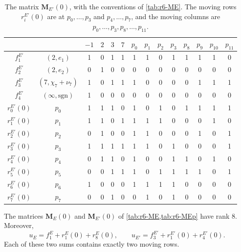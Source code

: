 \begin{table}[htbp]
\centering
\setlength{\tabcolsep}{4.2pt}
\caption{The matrix $\mathbf M_{E'}(0)$, with the conventions of \cref{tab:r6-ME}. The moving rows $r^{E'}_i(0)$ are at $p_0,\dots,p_3$ and $p_4,\dots,p_7$, and the moving columns are $p_0,\dots,p_3,p_8,\dots,p_{11}$.}
\label{tab:r6-MEp}
\begin{tabular}{cc@{\hspace{10pt}}cccc@{\hspace{12pt}}cccccccc}
\toprule
 & & $-1$ & $2$ & $3$ & $7$ & $p_0$ & $p_1$ & $p_2$ & $p_3$ & $p_8$ & $p_9$ & $p_{10}$ & $p_{11}$\\
\midrule
$f^{E'}_1$ & $(2,e_1)$ & 1 & 0 & 1 & 1 & 1 & 1 & 0 & 1 & 1 & 1 & 1 & 0 \\
$f^{E'}_2$ & $(2,e_2)$ & 0 & 1 & 0 & 0 & 0 & 0 & 0 & 0 & 0 & 0 & 0 & 0 \\
$f^{E'}_3$ & $(7,\chi_7+\nu_7)$ & 1 & 0 & 1 & 1 & 1 & 0 & 0 & 0 & 0 & 1 & 1 & 1 \\
$f^{E'}_4$ & $(\infty,\mathrm{sgn})$ & 1 & 0 & 0 & 0 & 0 & 0 & 0 & 0 & 0 & 0 & 0 & 0 \\
\midrule
$r^{E'}_0(0)$ & $p_0$ & 1 & 1 & 1 & 0 & 1 & 0 & 1 & 0 & 1 & 1 & 1 & 1 \\
$r^{E'}_1(0)$ & $p_1$ & 1 & 1 & 0 & 1 & 1 & 1 & 1 & 0 & 0 & 0 & 1 & 0 \\
$r^{E'}_2(0)$ & $p_2$ & 0 & 1 & 0 & 0 & 1 & 1 & 0 & 0 & 0 & 1 & 0 & 1 \\
$r^{E'}_3(0)$ & $p_3$ & 1 & 1 & 1 & 1 & 1 & 1 & 0 & 1 & 0 & 0 & 0 & 1 \\
$r^{E'}_4(0)$ & $p_4$ & 0 & 1 & 1 & 0 & 1 & 0 & 0 & 1 & 1 & 0 & 1 & 0 \\
$r^{E'}_5(0)$ & $p_5$ & 0 & 0 & 1 & 1 & 1 & 0 & 1 & 1 & 1 & 1 & 0 & 1 \\
$r^{E'}_6(0)$ & $p_6$ & 1 & 0 & 0 & 0 & 1 & 1 & 1 & 1 & 0 & 0 & 0 & 0 \\
$r^{E'}_7(0)$ & $p_7$ & 0 & 0 & 1 & 0 & 0 & 1 & 0 & 1 & 0 & 0 & 0 & 0 \\
\bottomrule
\end{tabular}
\end{table}

\begin{lemma}\label{lem:r6-rank}
The matrices $\mathbf M_E(0)$ and $\mathbf M_{E'}(0)$ of \cref{tab:r6-ME,tab:r6-MEp} have rank $8$. Moreover,
\begin{equation}\label{r6:u-sums}
u_E=f^E_1+r^E_1(0)+r^E_8(0),\qquad u_{E'}=f^{E'}_3+r^{E'}_1(0)+r^{E'}_4(0).
\end{equation}
Each of these two sums contains exactly two moving rows.
\end{lemma}

